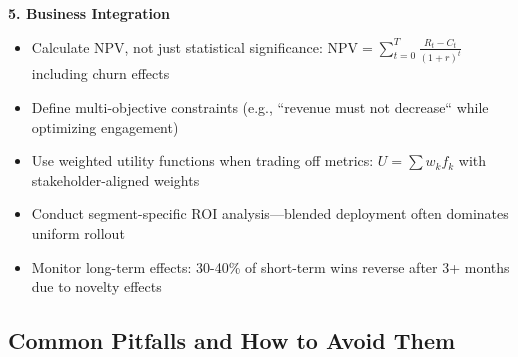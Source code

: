 \textbf{5. Business Integration}
\begin{itemize}
    \item Calculate NPV, not just statistical significance: $\text{NPV} = \sum_{t=0}^{T} \frac{R_t - C_t}{(1+r)^t}$ including churn effects
    \item Define multi-objective constraints (e.g., ``revenue must not decrease`` while optimizing engagement)
    \item Use weighted utility functions when trading off metrics: $U = \sum w_k f_k$ with stakeholder-aligned weights
    \item Conduct segment-specific ROI analysis---blended deployment often dominates uniform rollout
    \item Monitor long-term effects: 30-40\% of short-term wins reverse after 3+ months due to novelty effects
\end{itemize}

\subsection{Common Pitfalls and How to Avoid Them}

